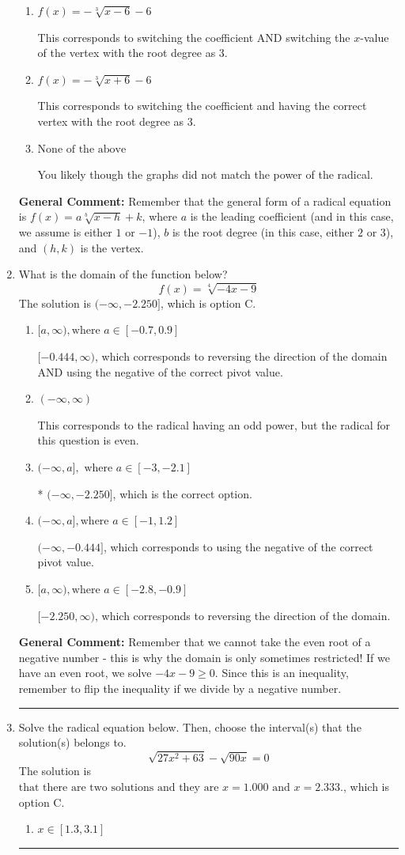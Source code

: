 \documentclass{extbook}[14pt]
\newcommand{\litem}[1]{\item #1

\rule{\textwidth}{0.4pt}}
\begin{document}
\begin{enumerate}
{\begin{enumerate}[label=\Alph*.]
* This is the correct option.
\item \( f(x) = - \sqrt[3]{x - 6} - 6 \)

This corresponds to switching the coefficient AND switching the $x$-value of the vertex with the root degree as $3$.
\item \( f(x) = - \sqrt[3]{x + 6} - 6 \)

This corresponds to switching the coefficient and having the correct vertex with the root degree as $3$.
\item \( \text{None of the above} \)

You likely though the graphs did not match the power of the radical.
\end{enumerate}

\textbf{General Comment:} Remember that the general form of a radical equation is $ f(x) = a \sqrt[b]{x - h} + k$, where $a$ is the leading coefficient (and in this case, we assume is either $1$ or $-1$), $b$ is the root degree (in this case, either $2$ or $3$), and $(h, k)$ is the vertex.
}
\litem{
What is the domain of the function below?
\[ f(x) = \sqrt[4]{-4 x - 9} \]
The solution is \( (-\infty, -2.250] \), which is option C.\begin{enumerate}[label=\Alph*.]
\item \( [a, \infty), \text{where } a \in [-0.7, 0.9] \)

$[-0.444, \infty)$, which corresponds to reversing the direction of the domain AND using the negative of the correct pivot value.
\item \( (-\infty, \infty) \)

This corresponds to the radical having an odd power, but the radical for this question is even.
\item \( (-\infty, a], \text{ where } a \in [-3, -2.1] \)

* $(-\infty, -2.250]$, which is the correct option.
\item \( (-\infty, a], \text{where } a \in [-1, 1.2] \)

$(-\infty, -0.444]$, which corresponds to using the negative of the correct pivot value.
\item \( [a, \infty), \text{where } a \in [-2.8, -0.9] \)

 $[-2.250, \infty)$, which corresponds to reversing the direction of the domain.
\end{enumerate}

\textbf{General Comment:} Remember that we cannot take the even root of a negative number - this is why the domain is only sometimes restricted! If we have an even root, we solve $-4 x - 9 \geq 0$. Since this is an inequality, remember to flip the inequality if we divide by a negative number.
}
\litem{
Solve the radical equation below. Then, choose the interval(s) that the solution(s) belongs to.
\[ \sqrt{27 x^2 + 63} - \sqrt{90 x} = 0 \]
The solution is \( \text{that there are two solutions and they are } x = 1.000 \text{ and } x = 2.333. \), which is option C.\begin{enumerate}[label=\Alph*.]
\item \( x \in [1.3,3.1] \)


\end{enumerate}}
\end{enumerate}
\end{document}
